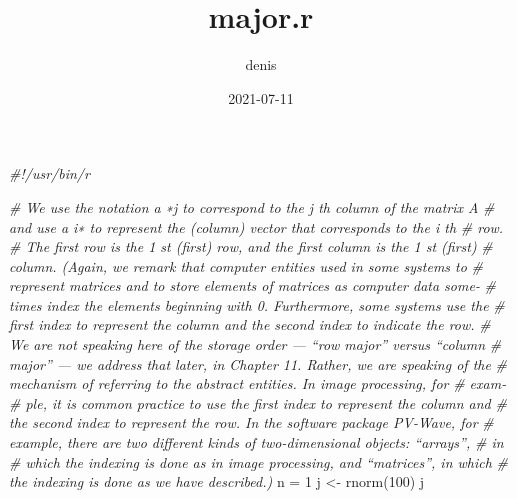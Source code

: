 \documentclass[
]{article}
\title{major.r}
\author{denis}
\date{2021-07-11}
\newenvironment{Shaded}{\begin{snugshade}}{\end{snugshade}}
\newcommand{\CommentTok}[1]{\textcolor[rgb]{0.56,0.35,0.01}{\textit{#1}}}
\newcommand{\DecValTok}[1]{\textcolor[rgb]{0.00,0.00,0.81}{#1}}
\newcommand{\FunctionTok}[1]{\textcolor[rgb]{0.00,0.00,0.00}{#1}}
\newcommand{\NormalTok}[1]{#1}
\newcommand{\OtherTok}[1]{\textcolor[rgb]{0.56,0.35,0.01}{#1}}
\begin{document}
\maketitle

\begin{Shaded}
\begin{Highlighting}[]
\CommentTok{\#!/usr/bin/r}

\CommentTok{\# We use the notation a ∗j to correspond to the j th column of the matrix A}
\CommentTok{\# and use a i∗ to represent the (column) vector that corresponds to the i th }
\CommentTok{\# row.}
\CommentTok{\# The ﬁrst row is the 1 st (ﬁrst) row, and the ﬁrst column is the 1 st (ﬁrst)}
\CommentTok{\# column. (Again, we remark that computer entities used in some systems to}
\CommentTok{\# represent matrices and to store elements of matrices as computer data some{-}}
\CommentTok{\# times index the elements beginning with 0. Furthermore, some systems use the}
\CommentTok{\# ﬁrst index to represent the column and the second index to indicate the row.}
\CommentTok{\# We are not speaking here of the storage order — “row major” versus “column}
\CommentTok{\# major” — we address that later, in Chapter 11. Rather, we are speaking of the}
\CommentTok{\# mechanism of referring to the abstract entities. In image processing, for }
\CommentTok{\# exam{-}}
\CommentTok{\# ple, it is common practice to use the ﬁrst index to represent the column and}
\CommentTok{\# the second index to represent the row. In the software package PV{-}Wave, for}
\CommentTok{\# example, there are two diﬀerent kinds of two{-}dimensional objects: “arrays”, }
\CommentTok{\# in}
\CommentTok{\# which the indexing is done as in image processing, and “matrices”, in which}
\CommentTok{\# the indexing is done as we have described.)}
\NormalTok{n }\OtherTok{=} \DecValTok{1}
\NormalTok{j }\OtherTok{\textless{}{-}} \FunctionTok{rnorm}\NormalTok{(}\DecValTok{100}\NormalTok{)}
\NormalTok{j}
\end{Highlighting}
\end{Shaded}
\end{document}
